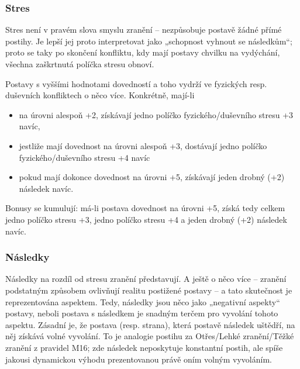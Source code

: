 \documentclass[../main.tex]{subfiles}
\begin{document}
\subsubsection{Stres}
\label{sec:stres}

Stres není v pravém slova smyslu zranění – nezpůsobuje postavě žádné přímé postihy. Je
lepší jej proto interpretovat jako „schopnost vyhnout se následkům“; proto se taky po
skončení konfliktu, kdy mají postavy chvilku na vydýchání, všechna zaškrtnutá políčka stresu obnoví.

\begin{pravidlo}
  Postavy s vyššími hodnotami dovedností  a  toho vydrží ve
  fyzických resp. duševních konfliktech o něco více. Konkrétně, mají-li 
  \begin{itemize}
    \item na úrovni alespoň +2, získávají jedno políčko fyzického/duševního stresu +3 navíc,
    \item jestliže mají dovednost na úrovni alespoň +3, dostávají jedno políčko fyzického/duševního
      stresu +4 navíc
    \item pokud mají dokonce dovednost na úrovni +5, získávají jeden drobný (+2)
      následek navíc.
  \end{itemize}
  Bonusy se kumulují: má-li postava dovednost na úrovni +5, získá tedy celkem jedno
  políčko stresu +3, jedno políčko stresu +4 a jeden drobný (+2) následek navíc.
\end{pravidlo}

\subsubsection{Následky}
\label{sec:následky}

Následky na rozdíl od stresu zranění představují. A ještě o něco více – zranění podstatným
způsobem ovlivňují realitu postižené postavy – a tato skutečnost je reprezentována
aspektem. Tedy, následky jsou něco jako „negativní aspekty“ postavy, neboli postava s následkem je snadným terčem pro vyvolání
tohoto aspektu. Zásadní je, že postava (resp. strana), která postavě následek uštědří, na
něj získává volné vyvolání. To je analogie postihu za Otřes/Lehké zranění/Těžké zranění z
pravidel M16; zde následek neposkytuje konstantní postih, ale spíše jakousi dynamickou
výhodu prezentovanou právě oním volným vyvoláním.
\end{document}
